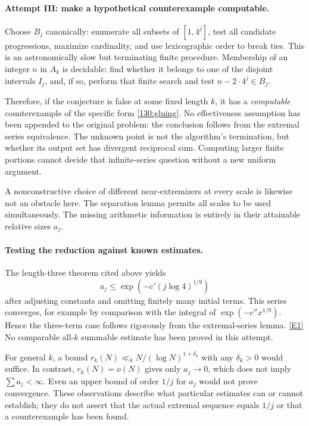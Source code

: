 \documentclass[11pt,a4paper]{article}
\newcommand{\eref}[2]{\hyperlink{extra:#1:#2}{[E#2]}}
\numberwithin{equation}{section}
\begin{document}
\paragraph{Attempt III: make a hypothetical counterexample computable.}
Choose $B_j$ canonically: enumerate all subsets of $[1,4^j]$, test
all candidate progressions, maximize cardinality, and use lexicographic
order to break ties.  This is an astronomically slow but terminating
finite procedure.  Membership of an integer $n$ in $A_k$ is decidable:
find whether it belongs to one of the disjoint intervals $I_j$, and,
if so, perform that finite search and test $n-2\cdot4^j\in B_j$.

Therefore, if the conjecture is false at some fixed length $k$, it
has a \emph{computable} counterexample of the specific form
\eqref{130:gluing}.  No effectiveness assumption has been appended
to the original problem: the conclusion follows from the extremal
series equivalence.  The unknown point is not the algorithm's
termination, but whether its output set has divergent reciprocal sum.
Computing larger finite portions cannot decide that infinite-series
question without a new uniform argument.

A nonconstructive choice of different near-extremizers at every scale
is likewise not an obstacle here.  The separation lemma permits all
scales to be used simultaneously.  The missing arithmetic information
is entirely in their attainable relative sizes $a_j$.

\paragraph{Testing the reduction against known estimates.}
The length-three theorem cited above yields
\[
 a_j\leq\exp(-c'(j\log4)^{1/9})
\]
after adjusting constants and omitting finitely many initial terms.
This series converges, for example by comparison with the integral
of $\exp(-c''x^{1/9})$.  Hence the three-term case follows rigorously
from the extremal-series lemma. \eref{130}{1}
No comparable all-$k$ summable estimate has been proved in this attempt.

For general $k$, a bound
$r_k(N)\ll_k N/(\log N)^{1+\delta_k}$ with any $\delta_k>0$ would
suffice.  In contrast, $r_k(N)=o(N)$ gives only $a_j\to0$, which does
not imply $\sum a_j<\infty$.  Even an upper bound of order $1/j$
for $a_j$ would not prove convergence.  These observations describe
what particular estimates can or cannot establish; they do not assert
that the actual extremal sequence equals $1/j$ or that a counterexample
has been found.
\end{document}
